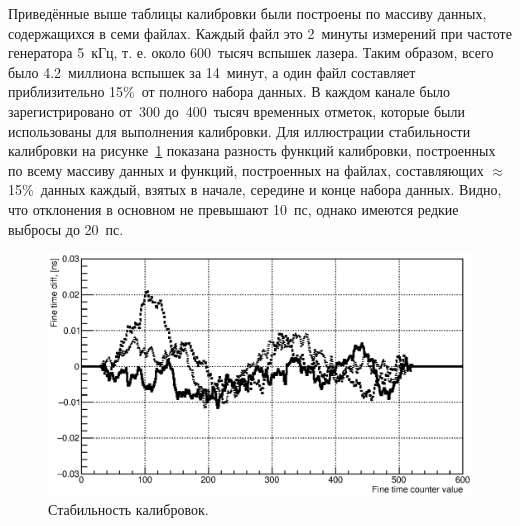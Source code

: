 Приведённые выше таблицы калибровки были построены по массиву данных, содержащихся в семи файлах. Каждый файл это 2~минуты измерений при частоте генератора 5~кГц, т. е. около 600~тысяч вспышек лазера. Таким образом, всего было 4.2~миллиона вспышек за  14~минут, а один файл составляет приблизительно 15\%~от полного набора данных. В каждом канале было зарегистрировано от~300 до~400~тысяч временных отметок, которые были использованы для выполнения калибровки. Для иллюстрации стабильности калибровки на рисунке~\ref{fig:Stability} показана разность функций калибровки, построенных по всему массиву данных и функций, построенных на файлах, составляющих $ \approx $15\%~данных каждый, взятых в начале, середине и конце набора данных. Видно, что отклонения в основном не превышают 10~пс, однако имеются редкие выбросы до 20~пс.

\begin{figure}
\includegraphics[width=1.0\textwidth]{pictures/calibrationStability_dec2016.eps}
\caption{Стабильность калибровок.}
\label{fig:Stability}
\end{figure}
